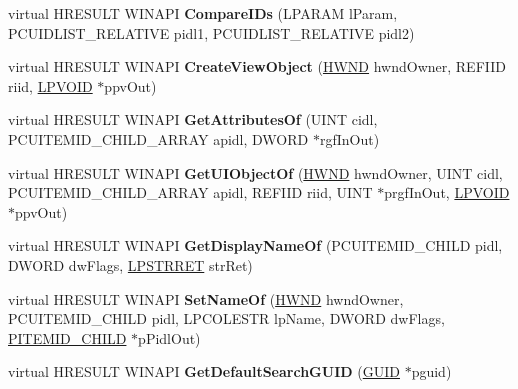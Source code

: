 \begin{DoxyCompactItemize}
virtual H\+R\+E\+S\+U\+LT W\+I\+N\+A\+PI {\bfseries Compare\+I\+Ds} (L\+P\+A\+R\+AM l\+Param, P\+C\+U\+I\+D\+L\+I\+S\+T\+\_\+\+R\+E\+L\+A\+T\+I\+VE pidl1, P\+C\+U\+I\+D\+L\+I\+S\+T\+\_\+\+R\+E\+L\+A\+T\+I\+VE pidl2)
\item 
\mbox{\label{class_c_reg_folder_aadd375844e9ac24610224415be761934}} 
virtual H\+R\+E\+S\+U\+LT W\+I\+N\+A\+PI {\bfseries Create\+View\+Object} (\hyperlink{interfacevoid}{H\+W\+ND} hwnd\+Owner, R\+E\+F\+I\+ID riid, \hyperlink{interfacevoid}{L\+P\+V\+O\+ID} $\ast$ppv\+Out)
\item 
\mbox{\label{class_c_reg_folder_a99d1428038e780e840c7eaadadf455aa}} 
virtual H\+R\+E\+S\+U\+LT W\+I\+N\+A\+PI {\bfseries Get\+Attributes\+Of} (U\+I\+NT cidl, P\+C\+U\+I\+T\+E\+M\+I\+D\+\_\+\+C\+H\+I\+L\+D\+\_\+\+A\+R\+R\+AY apidl, D\+W\+O\+RD $\ast$rgf\+In\+Out)
\item 
\mbox{\label{class_c_reg_folder_ae90c28bef746ae5c3e97101cbe40066d}} 
virtual H\+R\+E\+S\+U\+LT W\+I\+N\+A\+PI {\bfseries Get\+U\+I\+Object\+Of} (\hyperlink{interfacevoid}{H\+W\+ND} hwnd\+Owner, U\+I\+NT cidl, P\+C\+U\+I\+T\+E\+M\+I\+D\+\_\+\+C\+H\+I\+L\+D\+\_\+\+A\+R\+R\+AY apidl, R\+E\+F\+I\+ID riid, U\+I\+NT $\ast$prgf\+In\+Out, \hyperlink{interfacevoid}{L\+P\+V\+O\+ID} $\ast$ppv\+Out)
\item 
\mbox{\label{class_c_reg_folder_a816b4c8ff79fdc9ffe38ced191ef10cd}} 
virtual H\+R\+E\+S\+U\+LT W\+I\+N\+A\+PI {\bfseries Get\+Display\+Name\+Of} (P\+C\+U\+I\+T\+E\+M\+I\+D\+\_\+\+C\+H\+I\+LD pidl, D\+W\+O\+RD dw\+Flags, \hyperlink{struct___s_t_r_r_e_t}{L\+P\+S\+T\+R\+R\+ET} str\+Ret)
\item 
\mbox{\label{class_c_reg_folder_a94c08d9192381f1df775747006a408db}} 
virtual H\+R\+E\+S\+U\+LT W\+I\+N\+A\+PI {\bfseries Set\+Name\+Of} (\hyperlink{interfacevoid}{H\+W\+ND} hwnd\+Owner, P\+C\+U\+I\+T\+E\+M\+I\+D\+\_\+\+C\+H\+I\+LD pidl, L\+P\+C\+O\+L\+E\+S\+TR lp\+Name, D\+W\+O\+RD dw\+Flags, \hyperlink{struct___i_t_e_m_i_d___c_h_i_l_d}{P\+I\+T\+E\+M\+I\+D\+\_\+\+C\+H\+I\+LD} $\ast$p\+Pidl\+Out)
\item 
\mbox{\label{class_c_reg_folder_a33e35fc29c233dabfa7c9efc33a4a411}} 
virtual H\+R\+E\+S\+U\+LT W\+I\+N\+A\+PI {\bfseries Get\+Default\+Search\+G\+U\+ID} (\hyperlink{interface_g_u_i_d}{G\+U\+ID} $\ast$pguid)

\end{DoxyCompactItemize}
